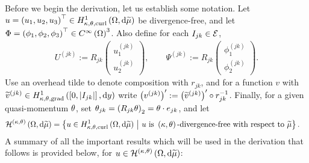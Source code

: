Before we begin the derivation, let us establish some notation.
Let $u=\left( u_1,u_2,u_3 \right)^\top\in H^1_{\kappa,\theta,\mathrm{curl}}\left( \Omega, \mathrm{d}\widetilde{\mu} \right)$ be divergence-free, and let $\Phi=\left( \phi_1,\phi_2,\phi_3 \right)^\top\in C^{\infty}\left( \Omega \right)^3$.
Also define for each $I_{jk}\in\mathcal{E}$,
\begin{align*}
	U^{(jk)} := R_{jk} \begin{pmatrix} u_1^{(jk)} \\ u_2^{(jk)} \end{pmatrix},
	\qquad
	\Psi^{(jk)} := R_{jk} \begin{pmatrix} \phi_1^{(jk)} \\ \phi_2^{(jk)} \end{pmatrix}.
\end{align*}
Use an overhead tilde to denote composition with $r_{jk}$, and for a function $v$ with $\widetilde{v}^{(jk)}\in H^1_{\kappa,\theta,\mathrm{grad}}\left( \left[ 0,\left\lvert I_{jk} \right\rvert \right], \mathrm{d}y \right)$ write $\left( v^{(jk)} \right)' := \left( \widetilde{v}^{(jk)} \right)' \circ r_{jk}^{-1}$.
Finally, for a given quasi-momentum $\theta$, set $\theta_{jk} = \left(  R_{jk}\theta  \right)_2 = \theta\cdot e_{jk}$, and let
\begin{align*}
	\mathcal{H}^{\left( \kappa, \theta \right)}\left( \Omega, \mathrm{d}\widetilde{\mu} \right) &=
	\left\{  u\in H^1_{\kappa,\theta,\mathrm{curl}}\left( \Omega, \mathrm{d}\widetilde{\mu} \right) \ \middle\vert \  u \text{ is } \left( \kappa, \theta \right)\text{-divergence-free with respect to } \widetilde{\mu} \right\}.
\end{align*}
A summary of all the important results which will be used in the derivation that follows is provided below, for $u\in\mathcal{H}^{\left( \kappa, \theta \right)}\left( \Omega, \mathrm{d}\widetilde{\mu} \right)$:
